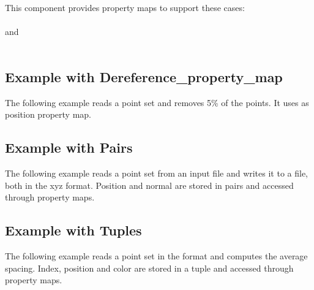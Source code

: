 This component provides property maps to support these cases:  \\
  \\
 and   \\
  \\

\subsection{Example with Dereference\_property\_map}

The following example reads a point set and removes 5\% of the points. It uses  as position property map.

\subsection{Example with Pairs}

The following example reads a point set from an input file and writes it to a file, both in the xyz format. Position and normal are stored in pairs and accessed through property maps.

\subsection{Example with Tuples}

The following example reads a point set in the  format and computes the average spacing. Index, position and color are stored in a tuple and accessed through property maps.

